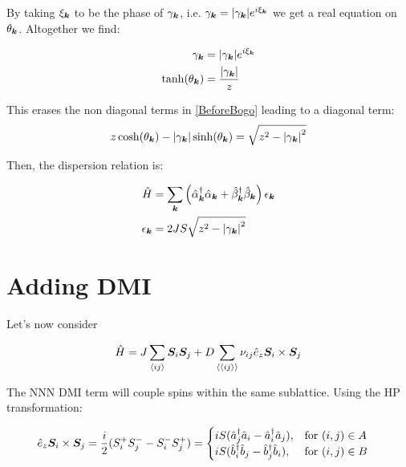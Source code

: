 By taking $\xi_{\boldsymbol{k}}$ to be the phase of $\gamma_{\boldsymbol{k}}$, i.e. $\gamma_{\boldsymbol{k}} = \abs{\gamma_{\boldsymbol{k}}} e^{i\xi_{\boldsymbol{k}}}$ we get a real equation on $\theta_{\boldsymbol{k}}$. Altogether we find:

\begin{align}
\gamma_{\boldsymbol{k}} &= \abs{\gamma_{\boldsymbol{k}}} e^{i\xi_{\boldsymbol{k}}} \\
\tanh(\theta_{\boldsymbol{k}}) &= \frac{\abs{\gamma_{\boldsymbol{k}}}}{z}
\end{align}

This erases the non diagonal terms in \ref{BeforeBogo} leading to a diagonal term:
\begin{equation}
z\cosh(\theta_{\boldsymbol{k}})-\abs{\gamma_{\boldsymbol{k}}}\sinh(\theta_{\boldsymbol{k}}) = \sqrt{z^2-\abs{\gamma_{\boldsymbol{k}}}^2}
\end{equation}

Then, the dispersion relation is:

\begin{align}
\hat{H} &= \sum_{\boldsymbol{k}}\left( \hat{\alpha}_{\boldsymbol{k}}^\dagger \hat{\alpha}_{\boldsymbol{k}} +\hat{\beta}_{\boldsymbol{k}}^\dagger \hat{\beta}_{\boldsymbol{k}} \right) \epsilon_{\boldsymbol{k}} \\
\epsilon_{\boldsymbol{k}} &= 2JS \sqrt{z^2-\abs{\gamma_{\boldsymbol{k}}}^2}
\end{align}

\section{Adding DMI}

Let's now consider

\begin{equation}
\hat{H} = J \sum_{\langle i j \rangle} \boldsymbol{S}_i \boldsymbol{S}_j + D \sum_{\langle \langle i j \rangle \rangle} \nu_{ij}\hat{e}_z \boldsymbol{S}_i \times \boldsymbol{S}_j
\end{equation}

The NNN DMI term will couple spins within the same sublattice. Using the HP transformation:

\begin{equation}
\hat{e}_z \boldsymbol{S}_i \times \boldsymbol{S}_j = \frac{i}{2}(S_i^+S_j^--S_i^-S_j^+) = \begin{cases}
             iS(\hat{a}_j^\dagger\hat{a}_i-\hat{a}_i^\dagger\hat{a}_j),  & \text{for } (i,j) \in A \\
             iS(\hat{b}_i^\dagger\hat{b}_j-\hat{b}_j^\dagger\hat{b}_i),  & \text{for } (i,j) \in B
       \end{cases} \quad
\end{equation}

